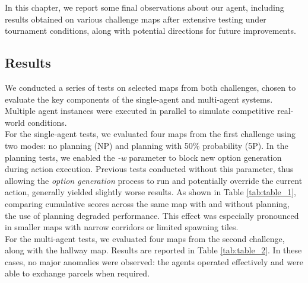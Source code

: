     In this chapter, we report some final observations about our agent, including results obtained on various challenge maps after extensive testing under tournament conditions, along with potential directions for future improvements.

    \subsection{Results}
        We conducted a series of tests on selected maps from both challenges, chosen to evaluate the key components of the single-agent and multi-agent systems. Multiple agent instances were executed in parallel to simulate competitive real-world conditions.
        \medskip\\
        For the single-agent tests, we evaluated four maps from the first challenge using two modes: no planning (NP) and planning with 50\% probability (5P). In the planning tests, we enabled the \textit{-w} parameter to block new option generation during action execution. Previous tests conducted without this parameter, thus allowing the \textit{option generation} process to run and potentially override the current action, generally yielded slightly worse results. As shown in Table \ref{tab:table_1}, comparing cumulative scores across the same map with and without planning, the use of planning degraded performance. This effect was especially pronounced in smaller maps with narrow corridors or limited spawning tiles.
        \medskip\\
        For the multi-agent tests, we evaluated four maps from the second challenge, along with the hallway map. Results are reported in Table \ref{tab:table_2}. In these cases, no major anomalies were observed: the agents operated effectively and were able to exchange parcels when required.
    
